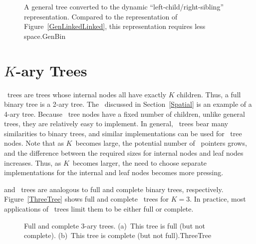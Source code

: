 \begin{figure}
\vspace{-\bigskipamount}

{A general tree converted to the dynamic ``left-child/right-sibling''
representation.
Compared to the representation of Figure~\ref{GenLinkedLinked}, this
representation requires less space.}{GenBin}
\medskip
\end{figure}


\section{\protect\boldmath $K$-ary Trees}
\label{Kary}

\Kary\ trees are trees whose internal nodes all have exactly \(K\)
children.
Thus, a full binary tree is a \mbox{2-ary} tree.
The \PRquad\ discussed in Section~\ref{Spatial} is an example of a
4-ary tree.
Because \Kary\ tree nodes have a fixed number of children,
unlike general trees, they are relatively easy to implement.
In general, \Kary\ trees bear many similarities to binary trees,
and similar implementations can be used for \Kary\ tree nodes.
Note that as \(K\)~becomes large, the potential number of \NULL\
pointers grows, and the difference between the required sizes for
internal nodes and leaf nodes increases.
Thus, as \(K\)~becomes larger, the need to choose separate
implementations for the internal and leaf nodes becomes more pressing.

 and  \Kary\ trees are analogous to full
and complete binary trees, respectively.
Figure~\ref{ThreeTree} shows full and complete \Kary\ trees for \(K=3\).
In practice, most applications of \Kary\ trees limit them to be either
full or complete.

\begin{figure}
\vspace{-\bigskipamount}\vspace{-\medskipamount}

{Full and complete 3-ary trees.
(a)~This tree is full (but not complete).
(b)~This tree is complete (but not full).}{ThreeTree}
\bigskip
\end{figure}

